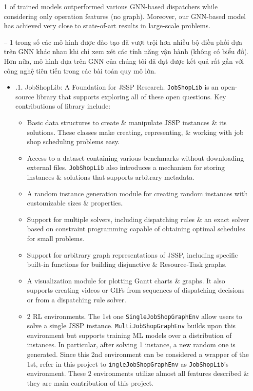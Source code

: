\documentclass{article}
\begin{document}
\begin{itemize}
\begin{itemize}
        1 of trained models outperformed various GNN-based dispatchers while considering only operation features (no graph). Moreover, our GNN-based model has achieved very close to state-of-art results in large-scale problems.

        -- 1 trong số các mô hình được đào tạo đã vượt trội hơn nhiều bộ điều phối dựa trên GNN khác nhau khi chỉ xem xét các tính năng vận hành (không có biểu đồ). Hơn nữa, mô hình dựa trên GNN của chúng tôi đã đạt được kết quả rất gần với công nghệ tiên tiến trong các bài toán quy mô lớn.
        \begin{itemize}
            \item {.1. JobShopLib: A Foundation for JSSP Research.} {\tt JobShopLib} is an open-source library that supports exploring all of these open questions. Key contributions of library include:
            \begin{itemize}
                \item Basic data structures to create \& manipulate JSSP instances \& its solutions. These classes make creating, representing, \& working with job shop scheduling problems easy.
                \item Access to a dataset containing various benchmarks without downloading external files. {\tt JobShopLib} also introduces a mechanism for storing instances \& solutions that supports arbitrary metadata.
                \item A random instance generation module for creating random instances with customizable sizes \& properties.
                \item Support for multiple solvers, including dispatching rules \& an exact solver based on constraint programming capable of obtaining optimal schedules for small problems.
                \item Support for arbitrary graph representations of JSSP, including specific built-in functions for building disjunctive \& Resource-Task graphs.
                \item A visualization module for plotting Gantt charts \& graphs. It also supports creating videos or GIFs from sequences of dispatching decisions or from a dispatching rule solver.
                \item 2 RL environments. The 1st one {\tt SingleJobShopGraphEnv} allow users to solve a single JSSP instance. {\tt MultiJobShopGraphEnv} builds upon this environment but supports training ML models over a distribution of instances. In particular, after solving 1 instance, a new random one is generated. Since this 2nd environment can be considered a wrapper of the 1st, refer in this project to {\tt ingleJobShopGraphEnv} as {\tt JobShopLib}'s environment. These 2 environments utilize almost all features described \& they are main contribution of this project.

\end{itemize}
\end{itemize}
\end{itemize}
\end{itemize}
\end{document}
